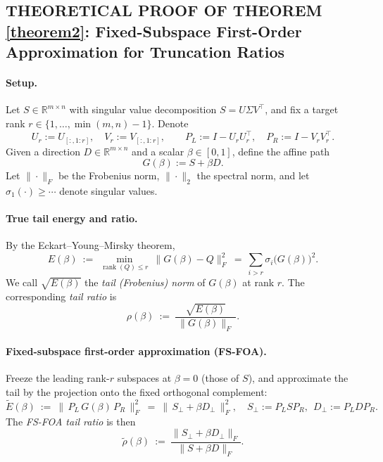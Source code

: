\newpage
\subsection{THEORETICAL PROOF OF THEOREM \ref{theorem2}: Fixed-Subspace First-Order Approximation for Truncation Ratios}
\label{app:fsfoa}
\label{theorem2 derivation}

\paragraph{Setup.}
Let $S\in\mathbb{R}^{m\times n}$ with singular value decomposition $S=U\Sigma V^\top$, and fix a target rank $r\in\{1,\dots,\min(m,n)-1\}$. Denote
\[
U_r:=U_{[:,1:r]},\quad V_r:=V_{[:,1:r]},\qquad
P_L:=I-U_rU_r^\top,\quad P_R:=I-V_rV_r^\top.
\]
Given a direction $D\in\mathbb{R}^{m\times n}$ and a scalar $\beta\in[0,1]$, define the affine path
\begin{equation}\label{eq:affine_path}
G(\beta):=S+\beta D.
\end{equation}
Let $\|\cdot\|_F$ be the Frobenius norm, $\|\cdot\|_2$ the spectral norm, and let $\sigma_1(\cdot)\ge\cdots$ denote singular values.

\paragraph{True tail energy and ratio.}
By the Eckart--Young--Mirsky theorem,
\begin{equation}\label{eq:tail_energy}
E(\beta)\ :=\ \min_{\operatorname{rank}(Q)\le r}\ \|G(\beta)-Q\|_F^2\ =\ \sum_{i>r}\sigma_i\!\big(G(\beta)\big)^2.
\end{equation}
We call $\sqrt{E(\beta)}$ the \emph{tail (Frobenius) norm} of $G(\beta)$ at rank $r$. The corresponding \emph{tail ratio} is
\begin{equation}\label{eq:tail_ratio}
\rho(\beta)\ :=\ \frac{\sqrt{E(\beta)}}{\ \|G(\beta)\|_F\ }.
\end{equation}

\paragraph{Fixed-subspace first-order approximation (FS-FOA).}
Freeze the leading rank-$r$ subspaces at $\beta=0$ (those of $S$), and approximate the tail by the projection onto the fixed orthogonal complement:
\begin{equation}\label{eq:fsfoa_tail_energy}
\widetilde E(\beta)\ :=\ \big\|\,P_L\,G(\beta)\,P_R\,\big\|_F^2
\ =\ \big\|\,S_\perp+\beta D_\perp\,\big\|_F^2, \quad
S_\perp:=P_LSP_R,\ \ D_\perp:=P_LDP_R.
\end{equation}
The \emph{FS-FOA tail ratio} is then
\begin{equation}\label{eq:fsfoa_ratio}
\widetilde\rho(\beta)\ :=\ \frac{\|S_\perp+\beta D_\perp\|_F}{\|S+\beta D\|_F}.
\end{equation}


